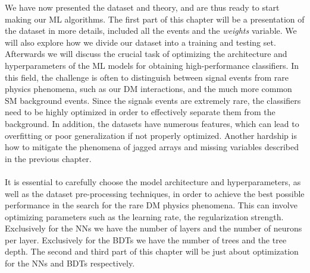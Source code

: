 \documentclass[12pt, a4paper]{book}
\begin{document}
\label{chap:Method_ML}
We have now presented the dataset and theory, and are thus ready to start making our ML algorithms. The first part of this chapter will be a presentation of the dataset in more details, included all the events and the \textit{weights} variable.
We will also explore how we divide our dataset into a training and testing set. Afterwards we will discuss the crucial task of optimizing the architecture and hyperparameters of the ML models for obtaining high-performance classifiers. In this field, the challenge is often to 
distinguish between signal events from rare physics phenomena, such as our DM interactions, and the much more common SM background events. Since the signals events are extremely rare, the classifiers need to be highly optimized in order to effectively separate them from 
the background. In addition, the datasets have numerous features, which can lead to overfitting or poor generalization if not properly optimized. Another hardship is how to mitigate the phenomena of jagged arrays and missing variables described in the previous chapter.\\
\\It is essential to carefully choose the model architecture and hyperparameters, as well as the dataset pre-processing techniques, in order to achieve the best possible performance in the search for the rare DM physics phenomena. This can involve optimizing 
parameters such as the learning rate, the regularization strength. Exclusively for the NNs we have the number of layers and the number of neurons per layer. Exclusively for the BDTs we have the number of trees and the tree depth. The second and third part of this chapter will be just about optimization for the NNs and BDTs respectively.

\clearpage
\end{document}
